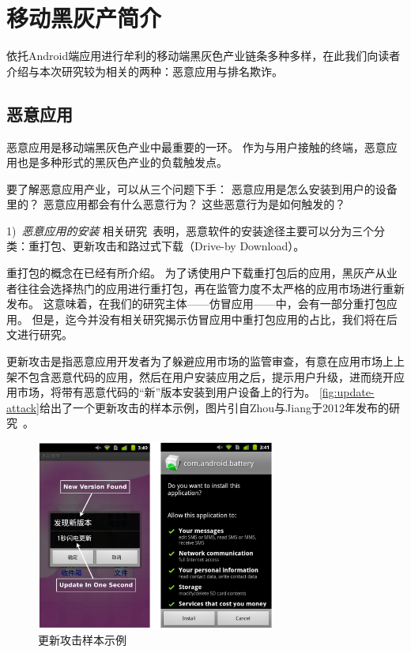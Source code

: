 \section{移动黑灰产简介}
依托Android端应用进行牟利的移动端黑灰色产业链条多种多样，在此我们向读者介绍与本次研究较为相关的两种：恶意应用与排名欺诈。

\subsection{恶意应用}
恶意应用是移动端黑灰色产业中最重要的一环。
作为与用户接触的终端，恶意应用也是多种形式的黑灰色产业的负载触发点。

要了解恶意应用产业，可以从三个问题下手：
恶意应用是怎么安装到用户的设备里的？
恶意应用都会有什么恶意行为？
这些恶意行为是如何触发的？

1)\ \emph{恶意应用的安装} \quad
相关研究~\cite{Zhou2012DissectingAM}表明，恶意软件的安装途径主要可以分为三个分类：重打包、更新攻击和路过式下载（Drive-by Download）。

重打包的概念在已经有所介绍。
为了诱使用户下载重打包后的应用，黑灰产从业者往往会选择热门的应用进行重打包，再在监管力度不太严格的应用市场进行重新发布。
这意味着，在我们的研究主体——仿冒应用——中，会有一部分重打包应用。
但是，迄今并没有相关研究揭示仿冒应用中重打包应用的占比，我们将在后文进行研究。

更新攻击是指恶意应用开发者为了躲避应用市场的监管审查，有意在应用市场上上架不包含恶意代码的应用，然后在用户安装应用之后，提示用户升级，进而绕开应用市场，将带有恶意代码的``新''版本安装到用户设备上的行为。
\autoref{fig:update-attack}给出了一个更新攻击的样本示例，图片引自Zhou与Jiang于2012年发布的研究~\cite{Zhou2012DissectingAM}。

\begin{figure}[h]
	\centering
	\includegraphics[width=0.7\textwidth]{./Figures/edwin-update-attack}
	\caption{更新攻击样本示例}
	\label{fig:update-attack}
	\vspace{-5mm}
\end{figure}

